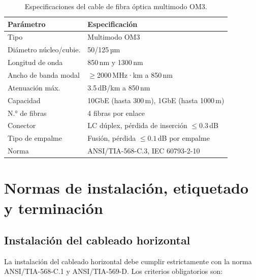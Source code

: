 \begin{table}[H]
    \centering
    \caption{Especificaciones del cable de fibra óptica multimodo OM3.}
    \label{tab:fo_om3}
    \begin{tabular}{|p{5cm}|p{8.5cm}|}
        \hline
        \textbf{Parámetro} & \textbf{Especificación} \\
        \hline
        Tipo                  & Multimodo OM3 \\
        \hline
        Diámetro núcleo/cubie.& 50/125\,µm \\
        \hline
        Longitud de onda      & 850\,nm y 1300\,nm \\
        \hline
        Ancho de banda modal  & $\geq$2000\,MHz·km a 850\,nm \\
        \hline
        Atenuación máx.\      & 3.5\,dB/km a 850\,nm \\
        \hline
        Capacidad             & 10GbE (hasta 300\,m), 1GbE (hasta 1000\,m) \\
        \hline
        N.° de fibras         & 4 fibras por enlace \\
        \hline
        Conector              & LC dúplex, pérdida de inserción $\leq 0.3$\,dB \\
        \hline
        Tipo de empalme       & Fusión, pérdida $\leq 0.1$\,dB por empalme \\
        \hline
        Norma                 & ANSI/TIA-568-C.3, IEC 60793-2-10 \\
        \hline
    \end{tabular}
\end{table}%
\nobreak\vspace{-0.3cm}
\section{Normas de instalación, etiquetado y terminación}
\label{sec:instalacion}

\subsection{Instalación del cableado horizontal}

La instalación del cableado horizontal debe cumplir estrictamente con la norma
\mbox{ANSI/TIA-568-C.1} y \mbox{ANSI/TIA-569-D}. Los criterios obligatorios son:

